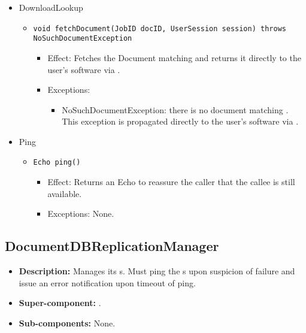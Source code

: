 \begin{itemize}
    \item DownloadLookup
	\begin{itemize}
		\item \texttt{void fetchDocument(JobID docID, UserSession session) throws NoSuchDocumentException}
		\begin{itemize}
			\item Effect: Fetches the Document matching  and returns it directly to the user's software via .
			\item Exceptions:
			\begin{itemize}
				\item NoSuchDocumentException: there is no document matching . This exception is propagated directly to the user's software via .
			\end{itemize}
		\end{itemize}
	\end{itemize}

	\item Ping
	\begin{itemize}
		\item \texttt{Echo ping()}
		\begin{itemize}
			\item Effect: Returns an Echo to reassure the caller that the callee is still available.
			\item Exceptions: None.
		\end{itemize}
	\end{itemize}
\end{itemize}

\subsection{DocumentDBReplicationManager}
\begin{itemize}
    \item \textbf{Description:} Manages its s. Must ping the s upon suspicion of failure and issue an error notification upon timeout of ping.
    \item \textbf{Super-component:} .
    \item \textbf{Sub-components:} None.
\end{itemize}

